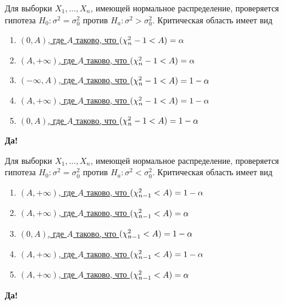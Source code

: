 \documentclass[t]{beamer}
\let\P\relax
\DeclareMathOperator{\P}{\mathbb{P}}
\begin{document}
 \begin{frame} \label{11-Yes} 
\begin{block}{11} 

  Для выборки $X_1,\ldots,X_n$, имеющей нормальное распределение, проверяется гипотеза $H_0: \sigma^2=\sigma_0^2$ против $H_a: \sigma^2 > \sigma_0^2$. Критическая область имеет вид
  


 \end{block} 
\begin{enumerate} 
\item[] \hyperlink{11-No}{\beamergotobutton{} $(0,A)$, где $A$ таково, что $\P(\chi^2_n-1 < A)  =\alpha$}
\item[] \hyperlink{11-No}{\beamergotobutton{} $(A,+\infty)$, где $A$ таково, что $\P(\chi^2_n-1 < A)  =\alpha$}
\item[] \hyperlink{11-No}{\beamergotobutton{} $(-\infty,A)$, где $A$ таково, что $\P(\chi^2_n-1 < A)  =1-\alpha$}
\item[] \hyperlink{11-Yes}{\beamergotobutton{} $(A,+\infty)$, где $A$ таково, что $\P(\chi^2_n-1 < A) =1-\alpha$}
\item[] \hyperlink{11-No}{\beamergotobutton{} $(0,A)$, где $A$ таково, что $\P(\chi^2_n-1 < A)  =1-\alpha$}
\end{enumerate} 

 \textbf{Да!} 
 \hyperlink{12}{}\end{frame} 


 \begin{frame} \label{12-Yes} 
\begin{block}{12} 

Для выборки $X_1,\ldots,X_n$, имеющей нормальное распределение, проверяется гипотеза $H_0: \sigma^2=\sigma_0^2$ против $H_a: \sigma^2 < \sigma_0^2$. Критическая область имеет вид



 \end{block} 
\begin{enumerate} 
\item[] \hyperlink{12-No}{\beamergotobutton{} $(A,+\infty)$, где $A$ таково, что $\P(\chi^2_{n-1} < A) =1-\alpha$}
\item[] \hyperlink{12-No}{\beamergotobutton{} $(A,+\infty)$, где $A$ таково, что $\P(\chi^2_{n-1} < A)  =\alpha$}
\item[] \hyperlink{12-No}{\beamergotobutton{} $(0,A)$, где $A$ таково, что $\P(\chi^2_{n-1} < A)  =1-\alpha$}
\item[] \hyperlink{12-Yes}{\beamergotobutton{} $(A,+\infty)$, где $A$ таково, что $\P(\chi^2_{n-1} < A) =1-\alpha$}
\item[] \hyperlink{12-No}{\beamergotobutton{} $(A,+\infty)$, где $A$ таково, что $\P(\chi^2_{n-1} < A)  =\alpha$}
\end{enumerate} 

 \textbf{Да!} 
 \hyperlink{13}{}\end{frame} 
\end{document}
